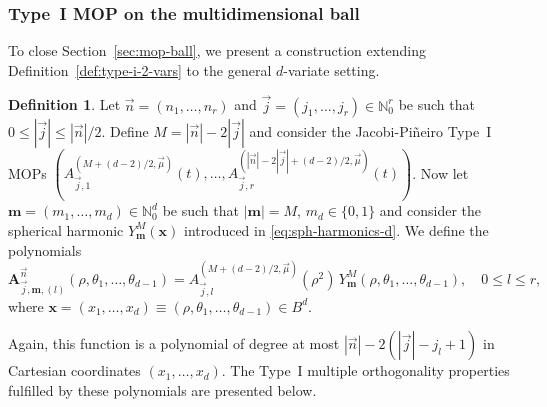 \documentclass[a4paper]{article}
\theoremstyle{plain}
\theoremstyle{definition}
\newtheorem{definition}[theorem]{Definition}
\newcommand{\NN}{\mathbb{N}}
\begin{document}
    \subsubsection{Type~I MOP on the multidimensional ball}
    
    To close Section~\ref{sec:mop-ball}, we present a construction extending Definition~\ref{def:type-i-2-vars} to the general $d$-variate setting.

    \begin{definition}
        Let $\vec n = (n_1,\dots,n_r)$ and $ \vec j = (j_1,\dots,j_r)\in\NN_0^r$ be such that $0\leq |\vec j| \leq |\vec n|/2$. Define $M=|\vec n|-2|\vec j|$ and consider the Jacobi-Pi\~neiro Type~I MOPs $\left(A_{\vec j,1}^{(M+(d-2)/2,\vec \mu)}(t),\dots,A_{\vec j,r}^{(|\vec n|-2|\vec j|+(d-2)/2,\vec \mu)}(t)\right)$. Now let $\mathbf m =(m_1,\dots,m_d)\in\NN^d_0$ be such that $|\mathbf m|=M$, $m_d\in\{0,1\}$ and consider the spherical harmonic $Y_{\mathbf m}^{M}(\mathbf x)$ introduced in \eqref{eq:sph-harmonics-d}. We define the polynomials
        \begin{equation}
            \label{eq:type-i-mop-d-vars}
            \mathbf A_{\vec j,\mathbf m,(l)}^{\vec n}(\rho,\theta_1,\dots,\theta_{d-1}) = A_{\vec j,l}^{(M+(d-2)/2,\vec \mu)}(\rho^2)\, Y_{\mathbf m}^{M}(\rho,\theta_1,\dots,\theta_{d-1}),\quad 0\leq l \leq r,
        \end{equation}
        where $\mathbf x =(x_1,\dots,x_d)\equiv(\rho,\theta_1,\dots,\theta_{d-1})\in B^d$.
    \end{definition}

    Again, this function is a polynomial of degree at most $|\vec n|-2(|\vec j|-j_l+1)$ in Cartesian coordinates $(x_1,\dots,x_d)$. The Type~I multiple orthogonality properties fulfilled by these polynomials are presented below.
\end{document}
